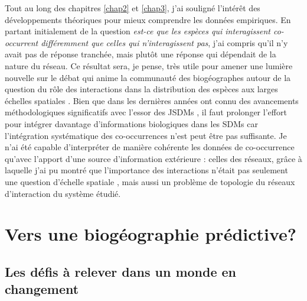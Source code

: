 Tout au long des chapitres \ref{chap2} et \ref{chap3}, j'ai souligné
l'intérêt des développements théoriques pour mieux comprendre les
données empiriques. En partant initialement de la question \emph{est-ce
que les espèces qui interagissent co-occurrent différemment que celles
qui n'interagissent pas}, j'ai compris qu'il n'y avait pas de réponse
tranchée, mais plutôt une réponse qui dépendait de la nature du réseau.
Ce résultat sera, je pense, très utile pour amener une lumière nouvelle
sur le débat qui anime la communauté des biogéographes autour de la
question du rôle des interactions dans la distribution des espèces aux
larges échelles spatiales \citep{Araujo2014, Godsoe2015}. Bien que dans
les dernières années ont connu des avancements méthodologiques
significatifs avec l'essor des JSDMs
\citep{Ovaskainen2010, Pollock2014, Warton2015b}, il faut prolonger
l'effort pour intégrer davantage d'informations biologiques dans les
SDMs car l'intégration systématique des co-occurrences n'est peut être
pas suffisante. Je n'ai été capable d'interpréter de manière cohérente
les données de co-occurrence qu'avec l'apport d'une source d'information
extérieure : celles des réseaux, grâce à laquelle j'ai pu montré que
l'importance des interactions n'était pas seulement une question
d'échelle spatiale \citep{Araujo2014, Belmaker2015}, mais aussi un
problème de topologie du réseaux d'interaction du système étudié.

\section*{Vers une biogéographie
prédictive?}\label{vers-une-bioguxe9ographie-pruxe9dictive}

\subsection*{Les défis à relever dans un monde en
changement}\label{les-duxe9fis-uxe0-relever-dans-un-monde-en-changement}

